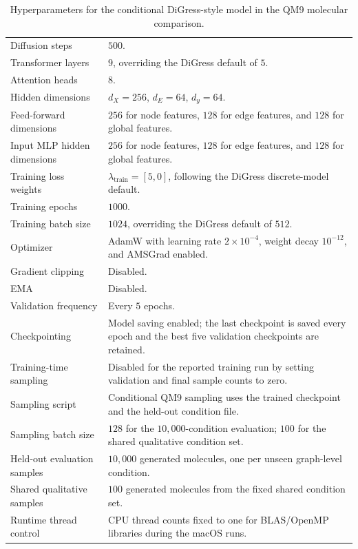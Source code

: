\begin{table}[p]
\begin{tabularx}{\textwidth}{@{}p{}X@{}}
Diffusion steps & \(500\). \\
Transformer layers & \(9\), overriding the DiGress default of \(5\). \\
Attention heads & \(8\). \\
Hidden dimensions & \(d_X=256\), \(d_E=64\), \(d_y=64\). \\
Feed-forward dimensions & \(256\) for node features, \(128\) for edge features, and \(128\) for global features. \\
Input MLP hidden dimensions & \(256\) for node features, \(128\) for edge features, and \(128\) for global features. \\
Training loss weights & \(\lambda_{\mathrm{train}}=[5,0]\), following the DiGress discrete-model default. \\
Training epochs & \(1000\). \\
Training batch size & \(1024\), overriding the DiGress default of \(512\). \\
Optimizer & AdamW with learning rate \(2\times 10^{-4}\), weight decay \(10^{-12}\), and AMSGrad enabled. \\
Gradient clipping & Disabled. \\
EMA & Disabled. \\
Validation frequency & Every \(5\) epochs. \\
Checkpointing & Model saving enabled; the last checkpoint is saved every epoch and the best five validation checkpoints are retained. \\
Training-time sampling & Disabled for the reported training run by setting validation and final sample counts to zero. \\
Sampling script & Conditional QM9 sampling uses the trained checkpoint and the held-out condition file. \\
Sampling batch size & \(128\) for the \(10{,}000\)-condition evaluation; \(100\) for the shared qualitative condition set. \\
Held-out evaluation samples & \(10{,}000\) generated molecules, one per unseen graph-level condition. \\
Shared qualitative samples & \(100\) generated molecules from the fixed shared condition set. \\
Runtime thread control & CPU thread counts fixed to one for BLAS/OpenMP libraries during the macOS runs. \\
\bottomrule
\end{tabularx}
\caption{Hyperparameters for the conditional DiGress-style model in the QM9 molecular comparison.}
\label{tab:qm9-digress-hyperparameters}
\end{table}
